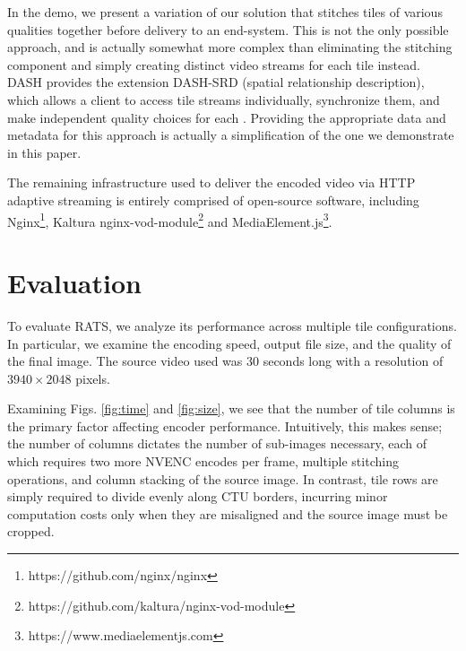 In the demo, we present
a variation of our solution that stitches tiles of various
qualities together before delivery to an end-system.
This is not the only possible approach, and is actually somewhat more complex
than eliminating the stitching component and simply creating distinct video streams for each tile instead. 
DASH provides the extension DASH-SRD (spatial relationship description), which
allows a client to access tile streams individually, synchronize them, and make
independent quality choices for each \cite{niamut2016}. Providing the appropriate data and
metadata for this approach is actually a simplification of the one we
demonstrate in this paper.

The remaining infrastructure used to deliver the encoded video via HTTP adaptive streaming is entirely comprised of open-source software, including Nginx\footnote{https://github.com/nginx/nginx}, Kaltura nginx-vod-module\footnote{https://github.com/kaltura/nginx-vod-module} and MediaElement.js\footnote{https://www.mediaelementjs.com}.



\section{Evaluation} \label{eval}

To evaluate RATS, we analyze its performance across multiple tile configurations. In particular, we examine the encoding speed, output file size, and the quality of the final image. The source video used was 30 seconds long with a resolution of $3940\times2048$ pixels.

Examining Figs. \ref{fig:time} and \ref{fig:size}, we see that the number of tile columns is the primary factor affecting encoder performance. Intuitively, this makes sense; the number of columns dictates the number of sub-images necessary, each of which requires two more NVENC encodes per frame, multiple stitching operations, and column stacking of the source image. In contrast, tile rows are simply required to divide evenly along CTU borders, incurring minor computation costs only when they are misaligned and the source image must be cropped.

